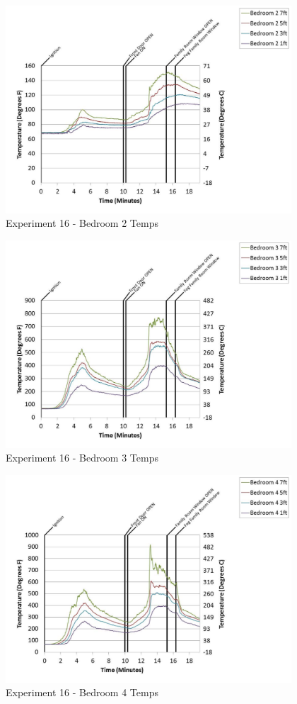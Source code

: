 \documentclass{article}
\begin{document}
\begin{appendices}
	\begin{figure}[h!]
		\centering
		\includegraphics[height=3.05in]{0_Images/Results_Charts/Exp_16_Charts/Bedroom2Temps.pdf}
		\caption{Experiment 16 - Bedroom 2 Temps}
	\end{figure}
 
	\clearpage

	\begin{figure}[h!]
		\centering
		\includegraphics[height=3.05in]{0_Images/Results_Charts/Exp_16_Charts/Bedroom3Temps.pdf}
		\caption{Experiment 16 - Bedroom 3 Temps}
	\end{figure}
 

	\begin{figure}[h!]
		\centering
		\includegraphics[height=3.05in]{0_Images/Results_Charts/Exp_16_Charts/Bedroom4Temps.pdf}
		\caption{Experiment 16 - Bedroom 4 Temps}
	\end{figure}
 

\end{appendices}
\end{document}

